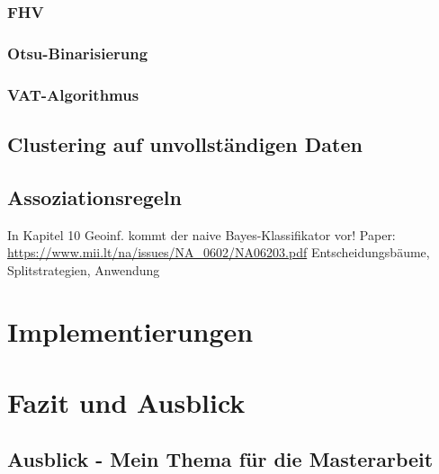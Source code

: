 \documentclass[11pt,ceqn]{book}
\begin{document}
\subsection{FHV}
\subsection{Otsu-Binarisierung}
\subsection{VAT-Algorithmus}


\section{Clustering auf unvollständigen Daten}

\section{Assoziationsregeln}
In Kapitel 10 Geoinf. kommt der naive Bayes-Klassifikator vor!
Paper: \url{https://www.mii.lt/na/issues/NA_0602/NA06203.pdf}
Entscheidungsbäume, Splitstrategien, Anwendung

\chapter{Implementierungen}


\chapter{Fazit und Ausblick}
\section{Ausblick - Mein Thema für die Masterarbeit}


\printbibliography
\vfill
\end{document}
